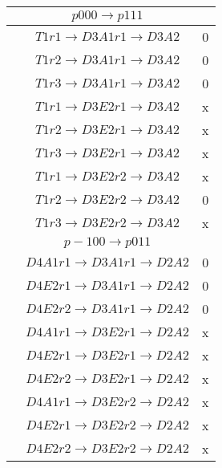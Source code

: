 \documentclass[10pt]{article}
\begin{document}
\begin{table}[!htbp]
\begin{minipage}[!htbp]{0.33\textwidth}
\begin{tabular}{cc c}
 &$p000 \rightarrow p111 $ \\ \hline
 & $T1 r1 \rightarrow D3A1 r1 \rightarrow D3A2$ & 0\\
 & $T1 r2 \rightarrow D3A1 r1 \rightarrow D3A2$ &  0\\
 & $T1 r3 \rightarrow D3A1 r1 \rightarrow D3A2$ &  0\\
 & $T1 r1 \rightarrow D3E2 r1 \rightarrow D3A2$ &  x\\
 & $T1 r2 \rightarrow D3E2 r1 \rightarrow D3A2$ &  x\\
 & $T1 r3 \rightarrow D3E2 r1 \rightarrow D3A2$ &  x\\
 & $T1 r1 \rightarrow D3E2 r2 \rightarrow D3A2$ &  x\\
 & $T1 r2 \rightarrow D3E2 r2 \rightarrow D3A2$ &  0\\
 & $T1 r3 \rightarrow D3E2 r2 \rightarrow D3A2$ &  x\\

\hline

 & $p-100 \rightarrow p011 $ \\ \hline
 & $D4A1 r1 \rightarrow D3A1 r1 \rightarrow D2A2$ & 0\\
 & $D4E2 r1 \rightarrow D3A1 r1 \rightarrow D2A2$ &  0\\
 & $D4E2 r2 \rightarrow D3A1 r1 \rightarrow D2A2$ &  0\\
 & $D4A1 r1 \rightarrow D3E2 r1 \rightarrow D2A2$ &  x\\
 & $D4E2 r1 \rightarrow D3E2 r1 \rightarrow D2A2$ &  x\\
 & $D4E2 r2 \rightarrow D3E2 r1 \rightarrow D2A2$ &  x\\
 & $D4A1 r1 \rightarrow D3E2 r2 \rightarrow D2A2$ &  x\\
 & $D4E2 r1 \rightarrow D3E2 r2 \rightarrow D2A2$ &  x\\
 & $D4E2 r2 \rightarrow D3E2 r2 \rightarrow D2A2$ &  x\\

\end{tabular}
\end{minipage}
\end{table}
\end{document}
